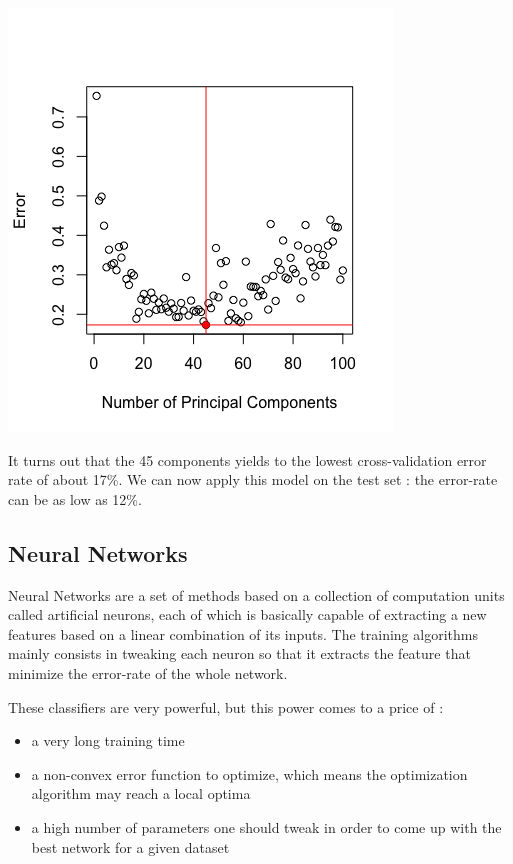 \documentclass[]{report}
\begin{document}
\begin{center}
	\includegraphics[width=0.6\linewidth]{Figures/lda_pca_cv_2.png}
	\label{fig:lda_pca_cv_2}
\end{center}

It turns out that the 45 components yields to the lowest cross-validation error rate of about 17\%. We can now apply this model on the test set : the error-rate can be as low as 12\%.

\pagebreak

\subsection{Neural Networks}

Neural Networks are a set of methods based on a collection of computation units called artificial neurons, each of which is basically capable of extracting a new features based on a linear combination of its inputs. The training algorithms mainly consists in tweaking each neuron so that it extracts the feature that minimize the error-rate of the whole network.

These classifiers are very powerful, but this power comes to a price of : 
\begin{itemize}
	\item a very long training time
	\item a non-convex error function to optimize, which means the optimization algorithm may reach a local optima
	\item a high number of parameters one should tweak in order to come up with the best network for a given dataset
\end{itemize}
\end{document}
